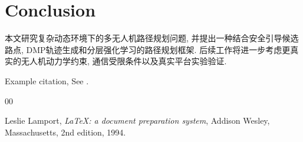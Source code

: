 
\section{Conclusion}

本文研究复杂动态环境下的多无人机路径规划问题, 并提出一种结合安全引导候选路点, DMP轨迹生成和分层强化学习的路径规划框架. 后续工作将进一步考虑更真实的无人机动力学约束, 通信受限条件以及真实平台实验验证.


Example citation, See \cite{lamport94}.




\begin{thebibliography}{00}


  Leslie Lamport,
  \textit{\LaTeX: a document preparation system},
  Addison Wesley, Massachusetts,
  2nd edition,
  1994.

\end{thebibliography}
